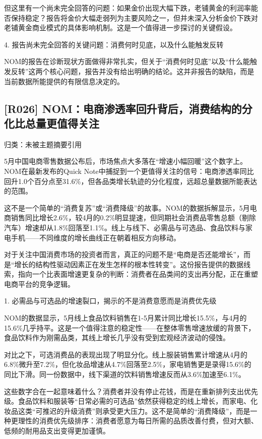 \documentclass[11pt]{ctexart}
\begin{document}
但这里有一个尚未完全回答的问题：如果金价出现大幅下跌，老铺黄金的利润率能否保持稳定？报告将金价大幅走弱列为主要风险之一，但并未深入分析金价下跌对老铺黄金商业模式的具体影响机制。这是一个值得进一步探讨的关键假设。

4. 报告尚未完全回答的关键问题：消费何时见底，以及什么能触发反转

NOM的报告在诊断现状方面做得非常扎实，但关于“消费何时见底”以及“什么能触发反转”这两个核心问题，报告并没有给出明确的结论。这并非报告的缺陷，而是当前数据所能提供的有限信息决定的。

\subsection{[R026] NOM：电商渗透率回升背后，消费结构的分化比总量更值得关注}
{\small\color{refgray}归类：未被主题摘要引用}

5月中国电商零售数据公布后，市场焦点大多落在“增速小幅回暖”这个数字上。NOM在最新发布的Quick Note中捕捉到一个更值得关注的信号：电商渗透率同比回升1.0个百分点至31.6\%，但各品类增长轨迹的分化程度，远超总量数据所能表达的范围。

这不是一个简单的“消费复苏”或“消费降级”的故事。NOM的数据拆解显示，5月电商销售同比增长2.6\%，较4月的0.2\%明显提速，但同期社会消费品零售总额（剔除汽车）增速却从1.8\%回落至1.1\%。线上与线下、必需品与可选品、食品饮料与家电手机——不同维度的增长曲线正在朝着相反方向移动。

对于关注中国消费市场的投资者而言，真正的问题不是“电商是否还能增长”，而是“增长的结构性驱动因素正在发生怎样的根本性转变”。这份报告提供的数据线索，指向一个比表面增速更复杂的判断：消费者在品类间的支出再分配，正在重塑电商平台的竞争逻辑。

1. 必需品与可选品的增速裂口，揭示的不是消费意愿而是消费优先级

NOM的数据显示，5月线上食品饮料销售在1-5月累计同比增长15.5\%，与4月的15.6\%几乎持平。这是一个值得注意的稳定性——在整体零售增速放缓的背景下，食品饮料作为刚需品类，其线上增长几乎没有受到宏观经济波动的侵蚀。

对比之下，可选消费品的表现出现了明显分化。线上服装销售累计增速从4月的6.8\%微升至7.2\%，但化妆品增速从4.7\%回落至2.5\%，家电销售更是录得15.6\%的同比下滑。同一份数据中，线下渠道的饮料销售增速反而从3.6\%加速至6.1\%。

这些数字合在一起意味着什么？消费者并没有停止花钱，而是在重新排列支出优先级。食品饮料和服装等“日常必需的可选品”依然获得稳定的线上增长，而家电、化妆品这类“可推迟的升级消费”则承受更大压力。这不是简单的“消费降级”，而是一种更理性的消费优先级排序：消费者愿意为每日所需的品质改善付费，但对大额、低频的耐用品支出变得更加谨慎。
\end{document}
